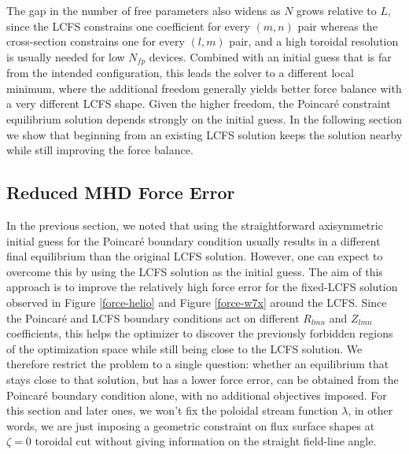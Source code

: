 \documentclass{jpp}
\begin{document}
The gap in the number of free parameters also widens as $N$ grows relative to $L$, since the LCFS constrains one coefficient for every $(m,n)$ pair whereas the cross-section constrains one for every $(l,m)$ pair, and a high toroidal resolution is usually needed for low $N_{fp}$ devices. Combined with an initial guess that is far from the intended configuration, this leads the solver to a different local minimum, where the additional freedom generally yields better force balance with a very different LCFS shape. Given the higher freedom, the Poincaré constraint equilibrium solution depends strongly on the initial guess. In the following section we show that beginning from an existing LCFS solution keeps the solution nearby while still improving the force balance.


\subsection{Reduced MHD Force Error}
In the previous section, we noted that using the straightforward axisymmetric initial guess for the Poincaré boundary condition usually results in a different final equilibrium than the original LCFS solution. However, one can expect to overcome this by using the LCFS solution as the initial guess. The aim of this approach is to improve the relatively high force error for the fixed-LCFS solution observed in Figure \ref{force-helio} and Figure \ref{force-w7x} around the LCFS. Since the Poincaré and LCFS boundary conditions act on different $R_{lmn}$ and $Z_{lmn}$ coefficients, this helps the optimizer to discover the previously forbidden regions of the optimization space while still being close to the LCFS solution. We therefore restrict the problem to a single question: whether an equilibrium that stays close to that solution, but has a lower force error, can be obtained from the Poincaré boundary condition alone, with no additional objectives imposed. For this section and later ones, we won't fix the poloidal stream function $\lambda$, in other words, we are just imposing a geometric constraint on flux surface shapes at $\zeta=0$ toroidal cut without giving information on the straight field-line angle.
\end{document}
